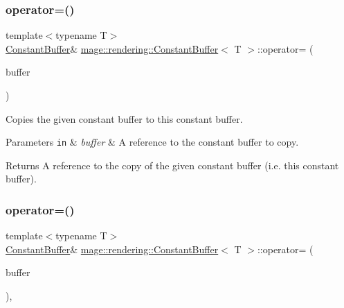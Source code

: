 \subsubsection{\texorpdfstring{operator=()}{operator=()}\hspace{0.1cm}{\footnotesize\ttfamily [1/2]}}
{\footnotesize\ttfamily template$<$typename T$>$ \\
\mbox{\hyperlink{classmage_1_1rendering_1_1_constant_buffer}{Constant\+Buffer}}\& \mbox{\hyperlink{classmage_1_1rendering_1_1_constant_buffer}{mage\+::rendering\+::\+Constant\+Buffer}}$<$ T $>$\+::operator= (\begin{DoxyParamCaption}\item[{const \mbox{\hyperlink{classmage_1_1rendering_1_1_constant_buffer}{Constant\+Buffer}}$<$ T $>$ \&}]{buffer }\end{DoxyParamCaption})\hspace{0.3cm}{\ttfamily [delete]}}

Copies the given constant buffer to this constant buffer.


\begin{DoxyParams}[1]{Parameters}
\mbox{\tt in}  & {\em buffer} & A reference to the constant buffer to copy. \\
\hline
\end{DoxyParams}
\begin{DoxyReturn}{Returns}
A reference to the copy of the given constant buffer (i.\+e. this constant buffer). 
\end{DoxyReturn}
\mbox{\label{classmage_1_1rendering_1_1_constant_buffer_adbd72a5aa7eab5461eed06c611dd908c}} 
\subsubsection{\texorpdfstring{operator=()}{operator=()}\hspace{0.1cm}{\footnotesize\ttfamily [2/2]}}
{\footnotesize\ttfamily template$<$typename T$>$ \\
\mbox{\hyperlink{classmage_1_1rendering_1_1_constant_buffer}{Constant\+Buffer}}\& \mbox{\hyperlink{classmage_1_1rendering_1_1_constant_buffer}{mage\+::rendering\+::\+Constant\+Buffer}}$<$ T $>$\+::operator= (\begin{DoxyParamCaption}\item[{\mbox{\hyperlink{classmage_1_1rendering_1_1_constant_buffer}{Constant\+Buffer}}$<$ T $>$ \&\&}]{buffer }\end{DoxyParamCaption})\hspace{0.3cm}{\ttfamily [default]}, {\ttfamily [noexcept]}}

